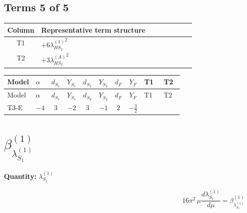 \documentclass[8pt]{article}
\begin{document}
\begin{landscape}
\subsection*{Terms 5 of 5}
\begin{center}
\begin{tabular}{@{}c >{\raggedright\arraybackslash}p{0.82\linewidth}@{}}
\toprule
Column & Representative term structure \\
\midrule
T1 & \(\displaystyle +6 {\lambda_{HS_2}^{(1)}}^2\) \\
\midrule
T2 & \(\displaystyle +3 {\lambda_{HS_2}^{(A)}}^2\) \\
\midrule
\bottomrule
\end{tabular}
\end{center}
\smallskip
\tiny
\begin{longtable}{@{}llcccccc >{\raggedright\arraybackslash}p{0.21\linewidth} >{\raggedright\arraybackslash}p{0.21\linewidth}@{}}
\toprule
Model & $\alpha$ & $d_{S_1}$ & $Y_{S_1}$ & $d_{S_2}$ & $Y_{S_2}$ & $d_F$ & $Y_F$ & T1 & T2 \\
\midrule
\endfirsthead
\toprule
Model & $\alpha$ & $d_{S_1}$ & $Y_{S_1}$ & $d_{S_2}$ & $Y_{S_2}$ & $d_F$ & $Y_F$ & T1 & T2 \\
\midrule
\endhead
T3-E & $-4$ & $3$ & $-2$ & $3$ & $-1$ & $2$ & $-\frac{3}{2}$ & \scriptsize\adjustbox{max width=\linewidth}{$\begin{gathered} +6 {\lambda_{HS_2}^{(1)}}^2\end{gathered}$} & \scriptsize\adjustbox{max width=\linewidth}{$\begin{gathered} +3 {\lambda_{HS_2}^{(A)}}^2\end{gathered}$} \\
\midrule
\bottomrule
\end{longtable}
\clearpage
\section*{$\beta_{\lambda_{S_1}^{(1)}}^{(1)}$}
\noindent\textbf{Quantity: }$\lambda_{S_1}^{(1)}$\par\smallskip
\[16\pi^2\,\mu\frac{d \lambda_{S_1}^{(1)}}{d\mu}=\beta_{\lambda_{S_1}^{(1)}}^{(1)}\]

\end{landscape}
\end{document}
